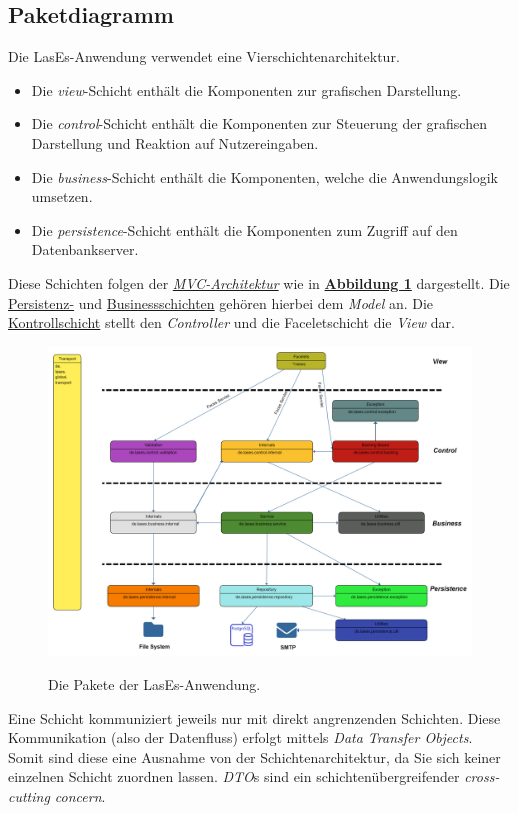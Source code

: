 
\subsection{Paketdiagramm}

Die LasEs-Anwendung verwendet eine Vierschichtenarchitektur.
\begin{itemize}
    \item Die \emph{view}-Schicht enthält die Komponenten zur grafischen Darstellung.
    \item Die \emph{control}-Schicht enthält die Komponenten zur Steuerung der grafischen Darstellung und Reaktion auf
    Nutzereingaben.
    \item Die \emph{business}-Schicht enthält die Komponenten, welche die Anwendungslogik umsetzen.
    \item Die \emph{persistence}-Schicht enthält die Komponenten zum Zugriff auf den Datenbankserver.
\end{itemize}
Diese Schichten folgen der \emph{\hyperref[arch:mvc]{MVC-Architektur}} wie in
\textbf{\hyperref[feinarch:pakdia]{Abbildung 1}} dargestellt.
Die \hyperref[arch:persistence]{Persistenz-} und
\hyperref[arch:business]{Businessschichten} gehören hierbei
dem \emph{Model} an. Die \hyperref[arch:control]{Kontrollschicht} stellt den \emph{Controller} und die
Faceletschicht die \emph{View} dar.
\begin{figure}[H]
    \centering
    \includegraphics[width=0.8\linewidth]{graphics/Paketdiagramm (15)}\label{feinarch:pakdia}
    \caption{Die Pakete der LasEs-Anwendung.}
\end{figure}

Eine Schicht kommuniziert jeweils nur mit direkt angrenzenden Schichten.
Diese Kommunikation (also der Datenfluss) erfolgt mittels \emph{Data Transfer Objects}.
Somit sind diese eine Ausnahme von der Schichtenarchitektur, da Sie sich keiner
einzelnen Schicht zuordnen lassen.
\emph{DTO}s sind ein schichtenübergreifender \emph{cross-cutting concern}.

